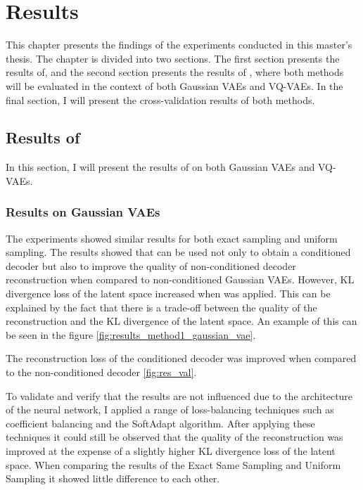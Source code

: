 \chapter{Results}

This chapter presents the findings of the experiments conducted in this master's thesis. The chapter is divided into two sections.
The first section presents the results of, and the second section presents the results of , where both methods will be evaluated in the context of both Gaussian VAEs and VQ-VAEs. In the final section, I will present the cross-validation results of both methods.

\section{Results of }

In this section, I will present the results of  on both Gaussian VAEs and VQ-VAEs.

\subsection{Results on Gaussian VAEs}

The experiments showed similar results for both exact sampling and uniform sampling. The results showed that  can be used not only to obtain a conditioned decoder but also to improve the quality of non-conditioned decoder reconstruction when compared to non-conditioned Gaussian VAEs. However, KL divergence loss of the latent space increased when  was applied. This can be explained by the fact that there is a trade-off between the quality of the reconstruction and the KL divergence of the latent space. An example of this can be seen in the figure \ref{fig:results_method1_gaussian_vae}. 

The reconstruction loss of the conditioned decoder was improved when compared to the non-conditioned decoder \ref{fig:res_val}.

To validate and verify that the results are not influenced due to the architecture of the neural network, I applied a range of loss-balancing techniques such as coefficient balancing and the SoftAdapt algorithm. After applying these techniques it could still be observed that the quality of the reconstruction was improved at the expense of a slightly higher KL divergence loss of the latent space. When comparing the results of the Exact Same Sampling and Uniform Sampling it showed little difference to each other.

